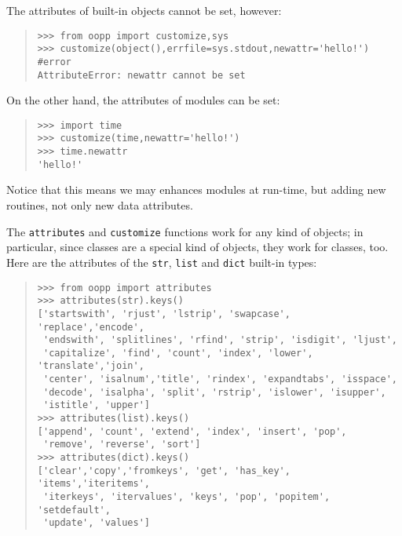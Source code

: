 \documentclass[10pt,english]{article}
\begin{document}
The attributes of built-in objects cannot be set, however:
\begin{quote}
\begin{verbatim}>>> from oopp import customize,sys
>>> customize(object(),errfile=sys.stdout,newattr='hello!') #error
AttributeError: newattr cannot be set\end{verbatim}
\end{quote}

On the other hand, the attributes of modules can be set:
\begin{quote}
\begin{verbatim}>>> import time
>>> customize(time,newattr='hello!')
>>> time.newattr
'hello!'\end{verbatim}
\end{quote}

Notice that this means we may enhances modules at run-time, but adding
new routines, not only new data attributes.

The \texttt{attributes} and \texttt{customize} functions work for any kind of objects; 
in particular, since classes are a special kind of objects, they work 
for classes, too. Here are the attributes of the \texttt{str}, \texttt{list} and 
\texttt{dict} built-in types:
\begin{quote}
\begin{verbatim}>>> from oopp import attributes
>>> attributes(str).keys()
['startswith', 'rjust', 'lstrip', 'swapcase', 'replace','encode',
 'endswith', 'splitlines', 'rfind', 'strip', 'isdigit', 'ljust', 
 'capitalize', 'find', 'count', 'index', 'lower', 'translate','join', 
 'center', 'isalnum','title', 'rindex', 'expandtabs', 'isspace', 
 'decode', 'isalpha', 'split', 'rstrip', 'islower', 'isupper', 
 'istitle', 'upper']
>>> attributes(list).keys()
['append', 'count', 'extend', 'index', 'insert', 'pop', 
 'remove', 'reverse', 'sort']
>>> attributes(dict).keys()
['clear','copy','fromkeys', 'get', 'has_key', 'items','iteritems',
 'iterkeys', 'itervalues', 'keys', 'pop', 'popitem', 'setdefault', 
 'update', 'values']\end{verbatim}
\end{quote}
\end{document}
